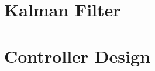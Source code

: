 \documentclass[a4paper]{article}
\begin{document}
\section{Kalman Filter}



\section{Controller Design}







\end{document}
